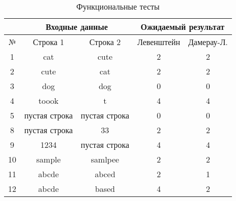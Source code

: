 \begin{table}[h]
	\begin{center}
		\caption{\label{tabular:functional_test} Функциональные тесты}
		\begin{tabular}{|c|c|c|c|c|}
			\hline
			& \multicolumn{2}{c|}{Входные данные} & \multicolumn{2}{c|}{Ожидаемый результат} \\
			\hline
			№&Строка 1&Строка 2&Левенштейн&Дамерау-Л. \\
			\hline
			1&cat&cute&2&2 \\
			\hline
			2&cute&cat&2&2 \\
			\hline
			3&dog&dog&0&0 \\
			\hline
			4&toook&t&4&4 \\
			\hline
			5&пустая строка&пустая строка&0&0 \\
			\hline
			8&пустая строка&33&2&2 \\
			\hline
			9&1234&пустая строка&4&4 \\
			\hline
			10&sample&samlpee&2&2 \\
			\hline
			11&abcde&abced&2&1 \\
			\hline
			12&abcde&based&4&2 \\
			\hline
		\end{tabular}
	\end{center}
\end{table}
